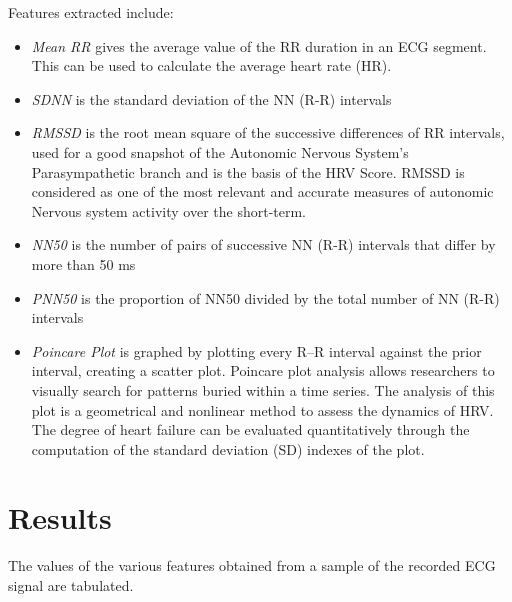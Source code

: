 \documentclass[11pt]{article}
\theoremstyle{definition}
\begin{document}
  Features extracted include:
  \begin{itemize}[topsep=1pt]
    \item[] \textit{Mean RR} gives the average value of the RR duration in an ECG segment. This can be used to calculate the average heart rate (HR).
    \item[] \textit{SDNN} is the standard deviation of the NN (R-R) intervals
    \item[] \textit{RMSSD} is the root mean square of the successive differences of RR intervals, used for a good snapshot of the Autonomic Nervous System’s Parasympathetic branch and is the basis of the HRV Score.  RMSSD is considered as one of the most relevant and accurate measures of autonomic Nervous system activity over the short-term.
    \item[] \textit{NN50} is the number of pairs of successive NN (R-R) intervals that differ by more than 50 ms
    \item[] \textit{PNN50} is the proportion of NN50 divided by the total number of NN (R-R) intervals
    \item[] \textit{Poincare Plot} is graphed by plotting every R–R interval against the prior interval, creating a scatter plot.
    Poincare plot analysis allows researchers to visually search for patterns buried within a time series.
    The analysis of this plot is a geometrical and nonlinear method to assess the dynamics of HRV.
    The degree of heart failure can be evaluated quantitatively through the computation of the standard deviation (SD) indexes of the plot\cite{hsu2012poincare}.
  \end{itemize}
  
  \section{Results}
  The values of the various features obtained from a sample of the recorded ECG signal are tabulated.
  
\end{document}
